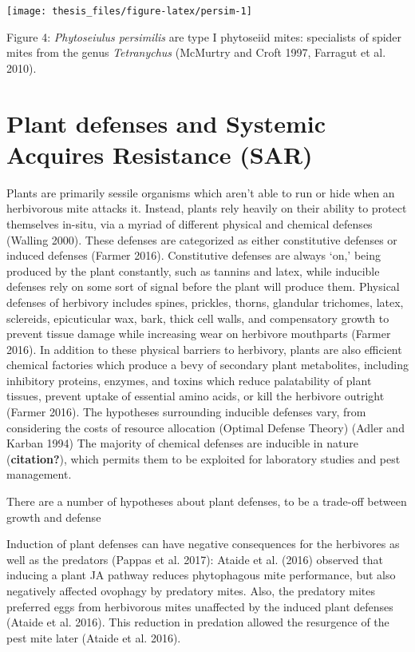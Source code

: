 \documentclass[12pt,final,CPage]{ufthesis}
\begin{document}
{  \begin{center}\texttt{[image: thesis\_files/figure-latex/persim-1]} \end{center}

  Figure 4: \emph{Phytoseiulus persimilis} are type I phytoseiid mites: specialists of spider mites from the genus \emph{Tetranychus} (McMurtry and Croft 1997, Farragut et al. 2010).

  \hypertarget{sar-litrev}{%
  \section{Plant defenses and Systemic Acquires Resistance (SAR)}\label{sar-litrev}}

  Plants are primarily sessile organisms which aren't able to run or hide when an herbivorous mite attacks it. Instead, plants rely heavily on their ability to protect themselves in-situ, via a myriad of different physical and chemical defenses (Walling 2000). These defenses are categorized as either constitutive defenses or induced defenses (Farmer 2016). Constitutive defenses are always `on,' being produced by the plant constantly, such as tannins and latex, while inducible defenses rely on some sort of signal before the plant will produce them. Physical defenses of herbivory includes spines, prickles, thorns, glandular trichomes, latex, sclereids, epicuticular wax, bark, thick cell walls, and compensatory growth to prevent tissue damage while increasing wear on herbivore mouthparts (Farmer 2016). In addition to these physical barriers to herbivory, plants are also efficient chemical factories which produce a bevy of secondary plant metabolites, including inhibitory proteins, enzymes, and toxins which reduce palatability of plant tissues, prevent uptake of essential amino acids, or kill the herbivore outright (Farmer 2016). The hypotheses surrounding inducible defenses vary, from considering the costs of resource allocation (Optimal Defense Theory) (Adler and Karban 1994) The majority of chemical defenses are inducible in nature (\textbf{citation?}), which permits them to be exploited for laboratory studies and pest management.

  There are a number of hypotheses about plant defenses, to be a trade-off between growth and defense

  Induction of plant defenses can have negative consequences for the herbivores as well as the predators (Pappas et al. 2017): Ataide et al. (2016) observed that inducing a plant JA pathway reduces phytophagous mite performance, but also negatively affected ovophagy by predatory mites. Also, the predatory mites preferred eggs from herbivorous mites unaffected by the induced plant defenses (Ataide et al. 2016). This reduction in predation allowed the resurgence of the pest mite later (Ataide et al. 2016).

}
\end{document}
